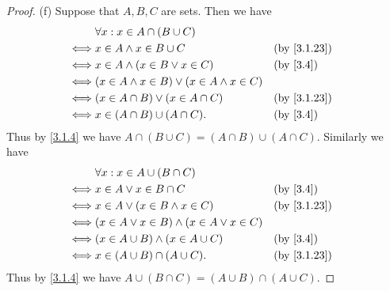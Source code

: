 \begin{proof}{(f)}
  Suppose that \(A, B, C\) are sets.
  Then we have
  \begin{align*}
         & \forall x : x \in A \cap (B \cup C)                                                 \\
    \iff & x \in A \land x \in B \cup C                         &  & \text{(by \cref{3.1.23})} \\
    \iff & x \in A \land (x \in B \lor x \in C)                 &  & \text{(by \cref{3.4})}    \\
    \iff & (x \in A \land x \in B) \lor (x \in A \land x \in C)                                \\
    \iff & (x \in A \cap B) \lor (x \in A \cap C)               &  & \text{(by \cref{3.1.23})} \\
    \iff & x \in (A \cap B) \cup (A \cap C).                    &  & \text{(by \cref{3.4})}
  \end{align*}
  Thus by \cref{3.1.4} we have \(A \cap (B \cup C) = (A \cap B) \cup (A \cap C)\).
  Similarly we have
  \begin{align*}
         & \forall x : x \in A \cup (B \cap C)                                                \\
    \iff & x \in A \lor x \in B \cap C                         &  & \text{(by \cref{3.4})}    \\
    \iff & x \in A \lor (x \in B \land x \in C)                &  & \text{(by \cref{3.1.23})} \\
    \iff & (x \in A \lor x \in B) \land (x \in A \lor x \in C)                                \\
    \iff & (x \in A \cup B) \land (x \in A \cup C)             &  & \text{(by \cref{3.4})}    \\
    \iff & x \in (A \cup B) \cap (A \cup C).                   &  & \text{(by \cref{3.1.23})}
  \end{align*}
  Thus by \cref{3.1.4} we have \(A \cup (B \cap C) = (A \cup B) \cap (A \cup C)\).
\end{proof}

